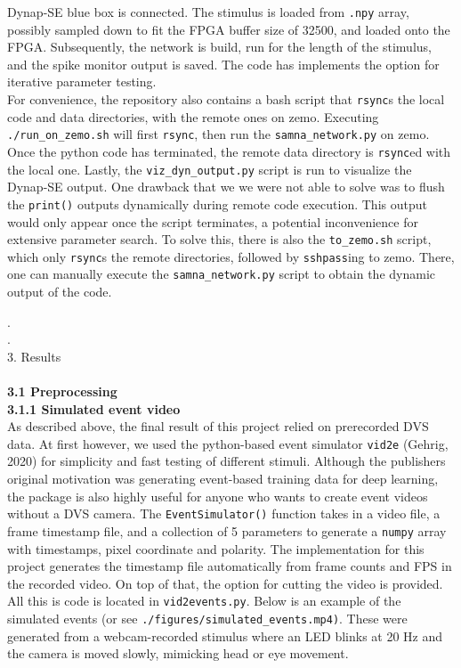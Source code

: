 \documentclass[8pt]{beamer}
\begin{document}
\begin{small}
	Dynap-SE blue box is connected. The stimulus is loaded from \verb|.npy|
	array, possibly sampled down to fit the FPGA buffer size of 32500, and
	loaded onto the FPGA. Subsequently, the network is build, run for the length
	of the stimulus, and the spike monitor output is saved. The code has
	implements the option for iterative parameter testing. \\ \vspace{.1cm}
	For convenience, the repository also contains a bash script that
	\verb|rsync|s the local code and data directories, with the remote ones on
	zemo. Executing \verb|./run_on_zemo.sh| will first \verb|rsync|, then run
	the \verb|samna_network.py| on zemo. Once the python code has terminated,
	the remote data directory is \verb|rsync|ed with the local one. Lastly, the
	\verb|viz_dyn_output.py| script is run to visualize the Dynap-SE output. One
	drawback that we we were not able to solve was to flush the \verb|print()|
	outputs dynamically during remote code execution. This output would only
	appear once the script terminates, a potential inconvenience for extensive
	parameter search. To solve this, there is also the \verb|to_zemo.sh| script,
	which only \verb|rsync|s the remote directories, followed by
	\verb|sshpass|ing to zemo. There, one can manually execute the
	\verb|samna_network.py| script to obtain the dynamic output of the code. 
	\pagebreak

	\tiny .\\
	\tiny .\\
	\large{3. Results} \\~\\
	\small
	\selectfont
	\textbf{3.1 Preprocessing} \\ 
	\hspace{.2cm} \textbf{3.1.1 Simulated event video} \\ 
	As described above, the final result of this project relied on prerecorded
	DVS data. At first however, we used the python-based event simulator
	\verb|vid2e| (Gehrig, 2020) for simplicity and fast testing of different
	stimuli. Although the publishers original motivation was generating
	event-based training data for deep learning, the package is also highly
	useful for anyone who wants to create event videos without a DVS camera. The
	\verb|EventSimulator()| function takes in a video file, a frame timestamp
	file, and a collection of 5 parameters to generate a \verb|numpy| array with
	timestamps, pixel coordinate and polarity. The implementation for this
	project generates the timestamp file automatically from frame counts and FPS
	in the recorded video. On top of that, the option for cutting the video is
	provided. All this is code is located in \verb|vid2events.py|. Below is an
	example of the simulated events (or see
	\verb|./figures/simulated_events.mp4)|. These were generated from a
	webcam-recorded stimulus where an LED blinks at 20 Hz and the camera is
	moved slowly, mimicking head or eye movement. 
	\pagebreak


\end{small}
\end{document}
